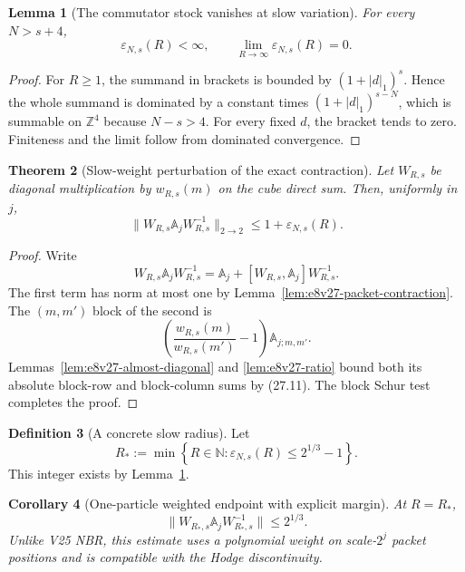 \documentclass[11pt,oneside]{book}
\newtheorem{theorem}{Theorem}[chapter]
\newtheorem{lemma}[theorem]{Lemma}
\newtheorem{corollary}[theorem]{Corollary}
\theoremstyle{definition}
\newtheorem{definition}[theorem]{Definition}
\theoremstyle{remark}
\begin{document}
\begin{lemma}[The commutator stock vanishes at slow variation]
\label{lem:e8v27-epsilon-limit}
For every \(N>s+4\),
\[
              \varepsilon_{N,s}(R)<\infty,\qquad
              \lim_{R\to\infty}\varepsilon_{N,s}(R)=0.            \tag{27.12}
\]
\end{lemma}

\begin{proof}
For \(R\geq1\), the summand in brackets is bounded by
\((1+|d|_1)^s\).  Hence the whole summand is dominated by a constant
times \((1+|d|_1)^{s-N}\), which is summable on
\({\mathbb Z}^4\) because \(N-s>4\).  For every fixed \(d\), the
bracket tends to zero.  Finiteness and the limit follow from dominated
convergence.
\end{proof}

\begin{theorem}[Slow-weight perturbation of the exact contraction]
\label{thm:e8v27-slow-weight}
Let \(W_{R,s}\) be diagonal multiplication by \(w_{R,s}(m)\) on the
cube direct sum.  Then, uniformly in \(j\),
\[
\boxed{\qquad
 \|W_{R,s}{\mathbb A}_jW_{R,s}^{-1}\|_{2\to2}
 \leq1+\varepsilon_{N,s}(R).
\qquad}                                                           \tag{27.13}
\]
\end{theorem}

\begin{proof}
Write
\[
 W_{R,s}{\mathbb A}_jW_{R,s}^{-1}
 ={\mathbb A}_j+
 [W_{R,s},{\mathbb A}_j]W_{R,s}^{-1}.                             \tag{27.14}
\]
The first term has norm at most one by
Lemma~\ref{lem:e8v27-packet-contraction}.  The \((m,m')\) block of
the second is
\[
 \left(\frac{w_{R,s}(m)}{w_{R,s}(m')}-1\right)
 {\mathbb A}_{j;m,m'}.
\]
Lemmas~\ref{lem:e8v27-almost-diagonal} and
\ref{lem:e8v27-ratio} bound both its absolute block-row and
block-column sums by (27.11).  The block Schur test completes the
proof.
\end{proof}

\begin{definition}[A concrete slow radius]
\label{def:e8v27-Rstar}
Let
\[
 R_*:=\min\left\{R\in{\mathbb N}:
 \varepsilon_{N,s}(R)\leq2^{1/3}-1\right\}.                       \tag{27.15}
\]
This integer exists by Lemma~\ref{lem:e8v27-epsilon-limit}.
\end{definition}

\begin{corollary}[One-particle weighted endpoint with explicit margin]
\label{cor:e8v27-one-particle}
At \(R=R_*\),
\[
 \|W_{R_*,s}{\mathbb A}_jW_{R_*,s}^{-1}\|
 \leq2^{1/3}.                                                     \tag{27.16}
\]
Unlike V25 NBR, this estimate uses a polynomial weight on
scale-\(2^j\) packet positions and is compatible with the Hodge
discontinuity.
\end{corollary}
\end{document}
